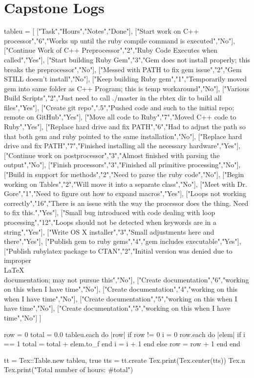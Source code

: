 \documentclass{hw}
\begin{document}
\section*{Capstone Logs}

\begin{rbtex}
tableu = [
    ["Task","Hours","Notes","Done"],
    ["Start work on C++ processor","6","Works up until the ruby compile command is executed","No"],
    ["Continue Work of C++ Preprocessor","2","Ruby Code Executes when called","Yes"],
    ["Start building Ruby Gem","3","Gem does not install properly; this breaks the preprocessor","No"],
    ["Messed with PATH to fix gem issue","2","Gem STILL doesn't install","No"],
    ["Keep building Ruby gem","1","Temporarily moved gem into same folder as C++ Program; this is temp workaround","No"],
    ["Various Build Scripts","2","Just need to call ./master in the rbtex dir to build all files","Yes"],
    ["Create git repo",".5","Pushed code and such to the initial repo; remote on GitHub","Yes"],
    ["Move all code to Ruby","7","Moved C++ code to Ruby","Yes"],
    ["Replace hard drive and fix PATH","6","Had to adjust the path so that both gem and ruby pointed to the same installation","No"],
    ["Replace hard drive and fix PATH","7","Finished installing all the necessary hardware","Yes"],
    ["Continue work on postprocessor","3","Almost finished with parsing the output","No"],
    ["Finish processors","3","Finished all primitive processing","No"],
    ["Build in support for methods","2","Need to parse the ruby code","No"],
    ["Begin working on Tables","2","Will move it into a separate class","No"],
    ["Meet with Dr. Gore","1","Need to figure out how to expand macros","Yes"],
    ["Loops not working correctly","16","There is an issue with the way the processor does the thing. Need to fix this.","Yes"],
    ["Small bug introduced with code dealing with loop processing","12","Loops should not be detected when keywords are in a string","Yes"],
    ["Write OS X installer","3","Small adjustments here and there","Yes"],
    ["Publish gem to ruby gems","4","gem includes executable","Yes"],
    ["Publish rubylatex package to CTAN","2","Initial version was denied due to improper \\LaTeX\\ documentation; may not pursue this","No"],
    ["Create documentation","6","working on this when I have time","No"],
    ["Create documentation","4","working on this when I have time","No"],
    ["Create documentation","5","working on this when I have time","No"],
    ["Create documentation","5","working on this when I have time","No"]
]

row = 0
total = 0.0
tableu.each do |row|
    if row != 0
        i = 0
        row.each do |elem|
            if i == 1
                total = total + elem.to_f
            end
            i = i + 1
        end
    else
        row = row + 1
    end
end

tt = Tex::Table.new tableu, true
tts = tt.create
Tex.print(Tex.center(tts))
Tex.n
Tex.print("Total number of hours: #{total}")
\end{rbtex}
\end{document}
